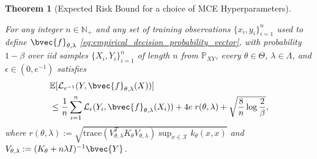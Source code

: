 \documentclass[twoside]{article}
\newtheorem{theorem}{Theorem}[section]
\begin{document}
		\begin{theorem}[Expected Risk Bound for a choice of \gls{MCE} Hyperparameters]
			\label{thm:expected_risk_bound_hyperparameter_learning_copy}
			
			For any integer $n \in \mathbb{N}_{+}$ and any set of training observations $\{x_{i}, y_{i}\}_{i = 1}^{n}$ used to define $\bvec{f}_{\theta, \lambda}$ \eqref{eq:empirical_decision_probability_vector}, with probability $1 - \beta$ over \textit{iid} samples $\{X_{i}, Y_{i}\}_{i = 1}^{n}$ of length $n$ from $\mathbb{P}_{X Y}$, every $\theta \in \Theta$, $\lambda \in \Lambda$, and $\epsilon \in (0, e^{-1})$ satisfies
			\begin{equation}
			\begin{aligned}
			&\mathbb{E}[\mathcal{L}_{e^{-1}}(Y, \bvec{f}_{\theta, \lambda}(X))] \\
			&\leq \frac{1}{n} \sum_{i = 1}^{n} \mathcal{L}_{\epsilon}(Y_{i}, \bvec{f}_{\theta, \lambda}(X_{i})) + 4 e \; r(\theta, \lambda) + \sqrt{\frac{8}{n} \log{\frac{2}{\beta}}},
			\label{eq:expected_risk_bound_hyperparameter_learning_copy}
			\end{aligned}
			\end{equation}
			where $r(\theta, \lambda) := \sqrt{\mathrm{trace}(V_{\theta, \lambda}^{T} K_{\theta} V_{\theta, \lambda}) \sup_{x \in \mathcal{X}} k_{\theta}(x, x)}$ and $V_{\theta, \lambda} := (K_{\theta} + n \lambda I)^{-1} \bvec{Y}$.
		\end{theorem}
		
\end{document}
